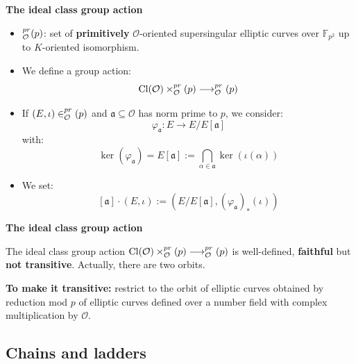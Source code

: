 \documentclass[10pt]{beamer}
\theoremstyle{plain}
\theoremstyle{definition}
\newcommand{\F}{\mathbb{F}}
\newcommand{\mO}{\mathcal{O}}
\renewcommand{\(}{\left(}
\renewcommand{\)}{\right)}
\newcommand{\mf}[1]{\mathfrak{#1}}
\DeclareMathOperator{\Cl}{Cl}
\let\SS\relax
\DeclareMathOperator{\SS}{SS}
\begin{document}
\begin{frame}
\textbf{The ideal class group action}

\vspace{0.5cm}

\begin{itemize}
\item $\SS_{\mO}^{pr}(p)$: set of \textbf{primitively} $\mO$-oriented supersingular elliptic curves over $\F_{p^2}$ up to $K$-oriented isomorphism.
\item We define a group action:
\[\Cl(\mO)\times\SS_{\mO}^{pr}(p)\longrightarrow \SS_{\mO}^{pr}(p)\]
\item If $(E,\iota)\in \SS_{\mO}^{pr}(p)$ and $\mf{a}\subseteq\mO$ has norm prime to $p$, we consider:
\[\varphi_{\mf{a}}:E\longrightarrow E/E[\mf{a}]\]
with:
\[\ker(\varphi_{\mf{a}})=E[\mf{a}]:=\bigcap_{\alpha\in\mf{a}}\ker(\iota(\alpha))\]
\item We set:
\[[\mf{a}]\cdot (E,\iota):=(E/E[\mf{a}],(\varphi_{\mf{a}})_*(\iota))\]
\end{itemize}
\end{frame}

\begin{frame}
\textbf{The ideal class group action}

\vspace{0.5cm}

\begin{theorem}
The ideal class group action $\Cl(\mO)\times\SS_{\mO}^{pr}(p)\longrightarrow \SS_{\mO}^{pr}(p)$ is well-defined, \textbf{faithful} but \textbf{not transitive}. Actually, there are two orbits.
\end{theorem}

\vspace{0.5cm}

\pause

\textbf{To make it transitive:} restrict to the orbit of elliptic curves obtained by reduction mod $p$ of elliptic curves defined over a number field with complex multiplication by $\mO$. 

\end{frame}

\subsection{Chains and ladders}
\end{document}
